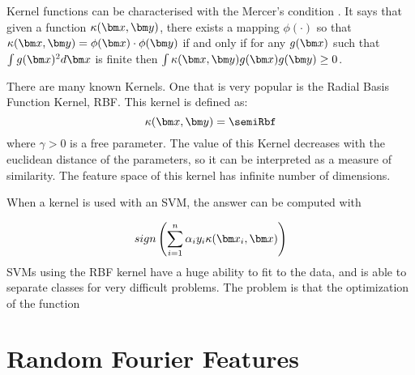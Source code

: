 \begin{pre-delivery}
Kernel functions can be characterised with the Mercer's condition
\cite{mercer1909functions}. It says that given a function $\kernel(\vx, \vy)$,
there exists a mapping $\phi(\cdot)$ so that
$\kernel(\vx, \vy) = \phi(\vx)\cdot\phi(\vy)$
if and only if for any $g(\vx)$ such that $\int g(\vx)^2 d\vx$ is finite then
$\int \kernel(\vx, \vy)g(\vx)g(\vy) \geq 0$.

There are many known Kernels. One that is very popular is the Radial Basis
Function Kernel\cite{vert2004primer}, RBF. This kernel is defined as:
\begin{equation}
\kernel(\vx,\vy) = \semiRbf
\end{equation}
where $\gamma > 0$ is a free parameter. The value of this Kernel decreases with the
euclidean distance of the parameters, so it can be interpreted as a measure
of similarity. The feature space of this kernel has infinite number of
dimensions.

When a kernel is used with an SVM, the answer can be computed with

\begin{equation}
sign\left(\sum_{i = 1}^n \alpha_iy_i\kernel(\vx_i, \vx)\right)
\end{equation}
SVMs using the RBF kernel have a huge ability to fit to the data, and is able
to separate classes for very difficult problems. The problem is that the
optimization of the function

\end{pre-delivery}

\section{Random Fourier Features}


